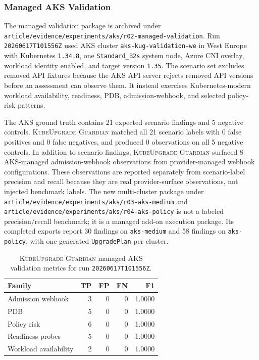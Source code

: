 \documentclass[10pt,journal]{IEEEtran}
\newcommand{\tool}{\textsc{KubeUpgrade Guardian}}
\newcommand{\crd}[1]{\texttt{#1}}
\newcommand{\code}[1]{\texttt{#1}}
\begin{document}
\subsubsection*{Managed AKS Validation}
The managed validation package is archived under \code{article/evidence/experiments/aks/r02-managed-validation}. Run \code{20260617T101556Z} used AKS cluster \code{aks-kug-validation-we} in West Europe with Kubernetes \code{1.34.8}, one \code{Standard\_B2s} system node, Azure CNI overlay, workload identity enabled, and target version \code{1.35}. The scenario set excludes removed API fixtures because the AKS API server rejects removed API versions before an assessment can observe them. It instead exercises Kubernetes-modern workload availability, readiness, PDB, admission-webhook, and selected policy-risk patterns.

The AKS ground truth contains 21 expected scenario findings and 5 negative controls. \tool{} matched all 21 scenario labels with 0 false positives and 0 false negatives, and produced 0 observations on all 5 negative controls. In addition to scenario findings, \tool{} surfaced 8 AKS-managed admission-webhook observations from provider-managed webhook configurations. These observations are reported separately from scenario-label precision and recall because they are real provider-surface observations, not injected benchmark labels. The new multi-cluster package under \code{article/evidence/experiments/aks/r03-aks-medium} and \code{article/evidence/experiments/aks/r04-aks-policy} is not a labeled precision/recall benchmark; it is a managed add-on execution package. Its completed exports report 30 findings on \code{aks-medium} and 58 findings on \code{aks-policy}, with one generated \crd{UpgradePlan} per cluster.

\begin{table}[t]
  \centering
  \caption{\tool{} managed AKS validation metrics for run \code{20260617T101556Z}.}
  \label{tab:aks-family}
  \begin{tabular}{lrrrr}
    \toprule
    Family & TP & FP & FN & F1 \\
    \midrule
    Admission webhook & 3 & 0 & 0 & 1.0000 \\
    PDB & 5 & 0 & 0 & 1.0000 \\
    Policy risk & 6 & 0 & 0 & 1.0000 \\
    Readiness probes & 5 & 0 & 0 & 1.0000 \\
    Workload availability & 2 & 0 & 0 & 1.0000 \\
    \bottomrule
  \end{tabular}
\end{table}
\end{document}
